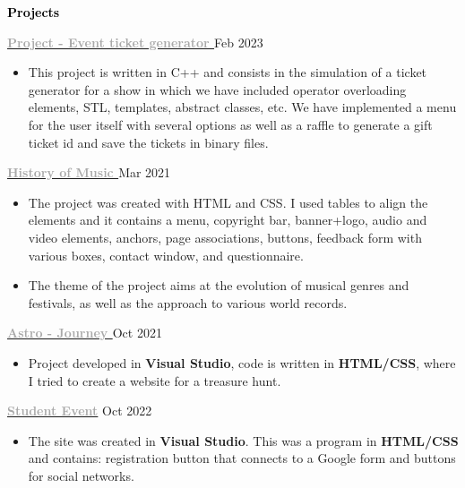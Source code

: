 \documentclass[11pt, a4paper]{article}
\newcommand{\newsection}[2]{\Large\textbf{\textcolor{#2}{#1}} \hrulefill\normalsize} %
\newcommand{\newsubsection}[4]{\normalsize\textbf{\textcolor{#3}{#1}} \hfill\small\textcolor{#4}{#2}\normalsize} %
\newcommand{\customitem}{\vspace{-1.5mm}\item}
\newenvironment{cvsection}[2] %
{
    \newsection{#1}{#2}
    \vspace{1mm}
    \small
    
}
{
    \vspace{1mm}
}
\newenvironment{newentry}[5] %
{
    \newsubsection{#1}{#2}{#3}{#4}
    \small
    
    \textcolor{#4}{#5}
    \begin{itemize}
        \small
}
{
    \end{itemize}
}
\begin{document}
    {\vspace{-1mm}}
\begin{cvsection}{Projects}{black}
\vspace{1mm}
\begin{newentry}{\href{https://github.com/Andrei4226/Proiect-POO-2022-2023}{\textcolor{darkgray}{ Project - Event ticket generator \faExternalLink}}}{Feb 2023}{darkgray}{mediumgray}{\vspace{-3mm}}
        \customitem This project is written in C++ and consists in the simulation of a ticket generator for a show in which we have included operator overloading elements, STL, templates, abstract classes, etc.
We have implemented a menu for the user itself with several options as well as a raffle to generate a gift ticket id and save the tickets in binary files.
    \end{newentry}

    \begin{newentry}{\href{https://github.com/Andrei4226/Istoria-muzicii}{\textcolor{darkgray}{ History of Music \faExternalLink}}}{Mar 2021}{darkgray}{mediumgray}{\vspace{-3mm}}
        \customitem The project was created with HTML and CSS. I used tables to align the elements and it contains a menu, copyright bar, banner+logo, audio and video elements, anchors, page associations, buttons, feedback form with various boxes, contact window, and questionnaire.
        \customitem The theme of the project aims at the evolution of musical genres and festivals, as well as the approach to various world records.
    \end{newentry}

    \begin{newentry}{\href{https://github.com/Andrei4226/Treasure-Hunt}{\textcolor{darkgray}{ Astro - Journey \faExternalLink}}}{Oct 2021}{darkgray}{mediumgray}{\vspace{-3mm}}
        \customitem Project developed in \textbf{Visual Studio}, code is written in \textbf{HTML/CSS}, where I tried to create a website for a treasure hunt.
    \end{newentry}

    \begin{newentry}{\href{https://github.com/Andrei4226/Crystal-Clear}{\textcolor{darkgray}{Student Event\faExternalLink}}}{Oct 2022}{darkgray}{mediumgray}{\vspace{-3mm}}
        \customitem The site was created in \textbf{Visual Studio}. This was a program in \textbf{HTML/CSS} and contains: registration button that connects to a Google form and buttons for social networks.
    \end{newentry}


\end{cvsection}
\end{document}
